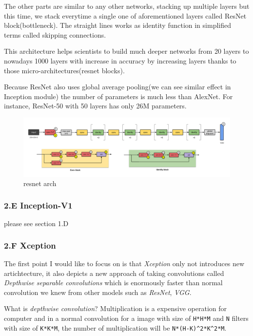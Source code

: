 \documentclass[11pt]{article}
\makeatletter
\def\maxwidth{\ifdim\Gin@nat@width>\linewidth\linewidth
    \else\Gin@nat@width\fi}
\let\Oldincludegraphics\includegraphics
\renewcommand{\includegraphics}[1]{\Oldincludegraphics[width=.8\maxwidth]{#1}}
\makeatother
\begin{document}
The other parts are similar to any other networks, stacking up multiple
layers but this time, we stack everytime a single one of aforementioned
layers called ResNet block(bottleneck). The straight lines works as
identity function in simplified terms called skipping connections.

This architecture helps scientists to build much deeper networks from 20
layers to nowadays 1000 layers with increase in accuracy by increasing
layers thanks to those micro-architectures(resnet blocks).

Because ResNet also uses global average pooling(we can see similar
effect in Inception module) the number of parameters is much less than
AlexNet. For instance, ResNet-50 with 50 layers has only 26M parameters.

\begin{figure}
\centering
\includegraphics{wiki/2_6.png}
\caption{resnet arch}
\end{figure}

    \hypertarget{e-inception-v1}{%
\subsubsection{2.E Inception-V1}\label{e-inception-v1}}

please see section 1.D

    \hypertarget{f-xception}{%
\subsubsection{2.F Xception}\label{f-xception}}

The first point I would like to focus on is that \emph{Xception} only
not introduces new artichtecture, it also depicts a new approach of
taking convolutions called \emph{Depthwise separable convolutions} which
is enormously faster than normal convolution we knew from other models
such as \emph{ResNet}, \emph{VGG}.

What is \emph{depthwise convolution}? Multiplication is a expensive
operation for computer and in a normal convolution for a image with size
of \texttt{H*H*M} and \texttt{N} filters with size of \texttt{K*K*M},
the number of multiplication will be \texttt{N*(H-K)\^{}2*K\^{}2*M}.
\end{document}
